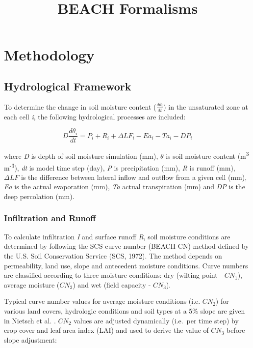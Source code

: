 \documentclass[]{article}
\title{BEACH Formalisms}
\author{}
\date{}
\begin{document}
\maketitle

\hypertarget{methodology}{%
\section{Methodology}\label{methodology}}

\hypertarget{hydrological-framework}{%
\subsection{Hydrological Framework}\label{hydrological-framework}}

To determine the change in soil moisture content
(\(\frac{d\theta_i}{dt}\)) in the unsaturated zone at each cell
\emph{i}, the following hydrological processes are included:

\begin{equation}
D\frac{d\theta_i}{dt} = P_i + R_i + \Delta LF_i - Ea_i - Ta_i - DP_i 
\label{eq:hydro} 
\end{equation}

where \emph{D} is depth of soil moisture simulation (mm), \(\theta\) is
soil moisture content (m\textsuperscript{3} m\textsuperscript{-3}),
\emph{dt} is model time step (day), \emph{P} is precipitation (mm),
\emph{R} is runoff (mm), \(\Delta LF\) is the difference between lateral
inflow and outflow from a given cell (mm), \emph{Ea} is the actual
evaporation (mm), \emph{Ta} actual transpiration (mm) and \emph{DP} is
the deep percolation (mm).

\hypertarget{infiltration-and-runoff}{%
\subsubsection{Infiltration and Runoff}\label{infiltration-and-runoff}}

To calculate infiltration \emph{I} and surface runoff \emph{R}, soil
moisture conditions are determined by following the SCS curve number
(BEACH-CN) method defined by the U.S. Soil Conservation Service (SCS,
1972). The method depends on permeability, land use, slope and
antecedent moisture conditions. Curve numbers are classified according
to three moisture conditions: dry (wilting point - \(CN_1\)), average
moisture (\(CN_2\)) and wet (field capacity - \(CN_3\)).

Typical curve number values for average moisture conditions (i.e.
\(CN_2\)) for various land covers, hydrologic conditions and soil types
at a 5\% slope are given in Nietsch et al. \citeyearpar{Neitsch2009}.
\(CN_2\) values are adjusted dynamically (i.e.~per time step) by crop
cover and leaf area index (LAI) and used to derive the value of \(CN_3\)
before slope adjustment:
\end{document}
